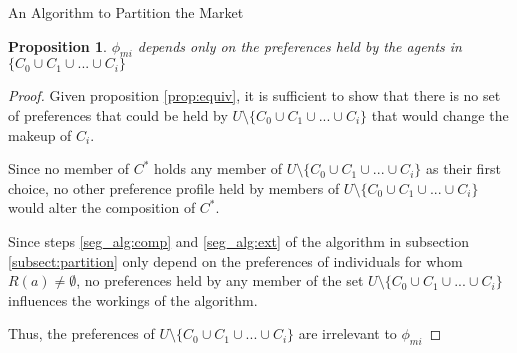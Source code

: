 \documentclass{beamer}
\newtheorem{prop}{Proposition}
\begin{document}
\begin{frame}{An Algorithm to Partition the Market}


\begin{prop}
	$\phi_{mi}$ depends only on the preferences held by the agents in $ \{C_0 \cup C_1 \cup  ...\cup C_i\}$
\end{prop}
\begin{proof}
	
	Given proposition \ref{prop:equiv}, it is sufficient to show that there is no set of preferences that could be held by $U \setminus \{C_0 \cup C_1 \cup  ...\cup C_i\}$ that would change the makeup of $C_i$. 
	
	Since no member of $C^*$ holds any member of $U \setminus \{C_0 \cup C_1 \cup  ...\cup C_i\}$  as their first choice, no other preference profile held by members of $U \setminus \{C_0 \cup C_1 \cup  ...\cup C_i\}$ would alter the composition of $C^*$.
	
	Since steps \ref{seg_alg:comp} and \ref{seg_alg:ext} of the algorithm in subsection \ref{subsect:partition} only depend on the preferences of individuals for whom $R(a)\neq \emptyset$, no preferences held by any member of the set $U \setminus \{C_0 \cup C_1 \cup  ...\cup C_i\}$ influences the workings of the algorithm.
	
	Thus, the  preferences of  $U \setminus \{C_0 \cup C_1 \cup  ...\cup C_i\}$ are irrelevant to $\phi_{mi}$
\end{proof}

\end{frame}
\end{document}
